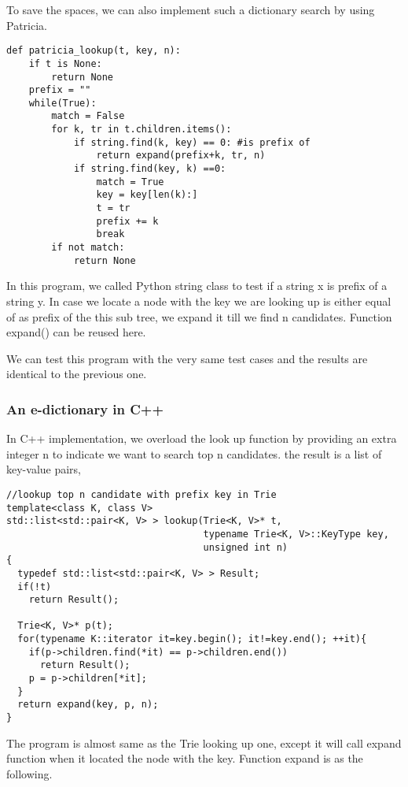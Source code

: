 \documentclass{article}
\begin{document}
To save the spaces, we can also implement such a dictionary search by using
Patricia.

\begin{lstlisting}
def patricia_lookup(t, key, n):
    if t is None:
        return None
    prefix = ""
    while(True):
        match = False
        for k, tr in t.children.items():
            if string.find(k, key) == 0: #is prefix of
                return expand(prefix+k, tr, n)
            if string.find(key, k) ==0:
                match = True
                key = key[len(k):]
                t = tr
                prefix += k
                break
        if not match:
            return None
\end{lstlisting}

In this program, we called Python string class to test if a string x is
prefix of a string y. In case we locate a node with the key we are looking
up is either equal of as prefix of the this sub tree, we expand it till
we find n candidates. Function expand() can be reused here.

We can test this program with the very same test cases and the results are
identical to the previous one.

\subsubsection*{An e-dictionary in C++}

In C++ implementation, we overload the look up function by providing an
extra integer n to indicate we want to search top n candidates. the
result is a list of key-value pairs,

\lstset{language=C++}
\begin{lstlisting}
//lookup top n candidate with prefix key in Trie
template<class K, class V>
std::list<std::pair<K, V> > lookup(Trie<K, V>* t,
                                   typename Trie<K, V>::KeyType key,
                                   unsigned int n)
{
  typedef std::list<std::pair<K, V> > Result;
  if(!t)
    return Result();

  Trie<K, V>* p(t);
  for(typename K::iterator it=key.begin(); it!=key.end(); ++it){
    if(p->children.find(*it) == p->children.end())
      return Result();
    p = p->children[*it];
  }
  return expand(key, p, n);
}
\end{lstlisting}

The program is almost same as the Trie looking up one, except it will
call expand function when it located the node with the key. Function
expand is as the following.
\end{document}
